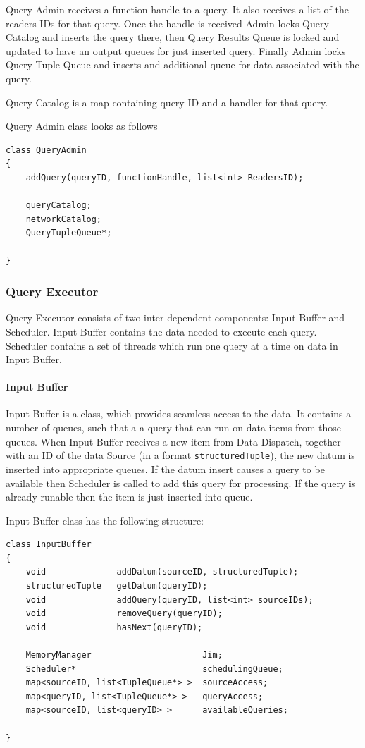 \documentclass[11pt]{article}
\begin{document}
Query Admin receives a function handle to a query. It also receives a list of the readers IDs for that query. Once the handle is received Admin locks Query Catalog and inserts the query there, then Query Results Queue is locked and updated to have an output queues for just inserted query. Finally Admin locks Query Tuple Queue and inserts and additional queue for data associated with the query. 

Query Catalog is a map containing query ID and a handler for that query. 

Query Admin class looks as follows
\begin{verbatim}
class QueryAdmin
{
    addQuery(queryID, functionHandle, list<int> ReadersID);

	queryCatalog;
	networkCatalog;
	QueryTupleQueue*;
	
}
\end{verbatim}

\subsubsection{Query Executor}

Query Executor consists of two inter dependent components: Input Buffer and Scheduler. Input Buffer contains the data needed to execute each query. Scheduler contains a set of threads which run one query at a time on data in Input Buffer.  

\paragraph{Input Buffer}

Input Buffer is a class, which provides seamless access to the data. It contains a number of queues, such that a a query that can run on data items from those queues. When Input Buffer receives a new item from Data Dispatch, together with an ID of the data Source (in a format {\tt structuredTuple}), the new datum is inserted into appropriate queues. If the datum insert causes a query to be available then Scheduler is called to add this query for processing. If the query is already runable then the item is just inserted into queue.

Input Buffer class has the following structure:

\begin{verbatim}
class InputBuffer
{
    void              addDatum(sourceID, structuredTuple);
    structuredTuple   getDatum(queryID);
    void              addQuery(queryID, list<int> sourceIDs);
    void              removeQuery(queryID);
    void              hasNext(queryID);

	MemoryManager                      Jim;
	Scheduler*                         schedulingQueue;
	map<sourceID, list<TupleQueue*> >  sourceAccess;
	map<queryID, list<TupleQueue*> >   queryAccess;
	map<sourceID, list<queryID> >      availableQueries;
	
}
\end{verbatim}
\end{document}
